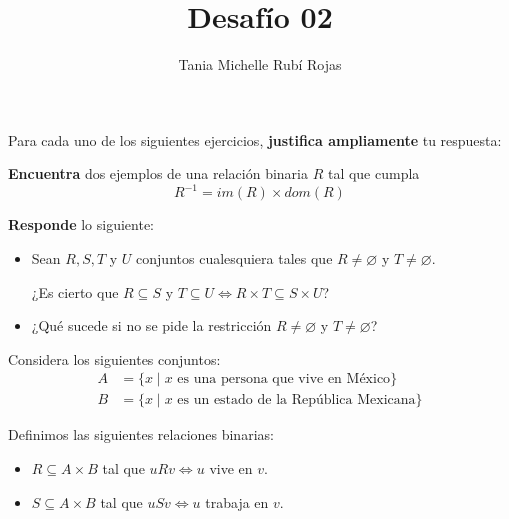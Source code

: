 \documentclass[oneside]{style}
\title{Desafío 02}
\author{Tania Michelle Rubí Rojas}
\begin{document}
\maketitle

Para cada uno de los siguientes ejercicios, \textbf{justifica ampliamente} tu 
respuesta:

\begin{questions}[label=\protect\circled{\bfseries\arabic*}]
    \question
    {
        \textbf{Encuentra} dos ejemplos de una relación binaria $R$ tal 
        que cumpla
        \begin{equation*}
            R^{-1} = im(R) \times dom(R)
        \end{equation*} 
    }

    \question
    {
        \textbf{Responde} lo siguiente:
        \begin{itemize}
            \item Sean $R,S,T$ y $U$ conjuntos cualesquiera tales que 
            $R \neq \varnothing$ y $T \neq \varnothing$. 
            \begin{center}
                ¿Es cierto que $R \subseteq S$ y $T \subseteq U \Leftrightarrow 
                R \times T \subseteq S \times U$?
            \end{center}

            \item ¿Qué sucede si no se pide la restricción $R \neq \varnothing$ 
            y $T \neq \varnothing$?
        \end{itemize}
    }

    \question
    {
        Considera los siguientes conjuntos:
        \begin{align*}
            A &= \{x \; | \; x \text{ es una persona que vive en México}\} \\ 
            B &= \{x \; | \; x \text{ es un estado de la República Mexicana}\}
        \end{align*}

        Definimos las siguientes relaciones binarias:
        \begin{itemize}
            \item $R \subseteq A \times B$ tal que $u R v \Leftrightarrow u$ 
            vive en $v$.

            \item $S \subseteq A \times B$ tal que $u S v \Leftrightarrow u$ 
            trabaja en $v$.
        \end{itemize}

}
\end{questions}
\end{document}
